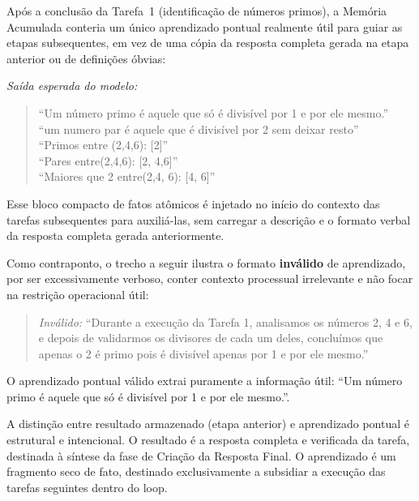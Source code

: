 \documentclass[a4paper,10pt,twocolumn]{article}
\newcommand{\saidaLLM}{%
  \smallskip\noindent\textit{Saída esperada do modelo:}\smallskip\par
}
\begin{document}
\begin{exemplo}
Após a conclusão da Tarefa~1 (identificação de números primos), a Memória Acumulada conteria um único aprendizado pontual realmente útil para guiar as etapas subsequentes, em vez de uma cópia da resposta completa gerada na etapa anterior ou de definições óbvias:

\saidaLLM

\begin{quote}
``Um número primo é aquele que só é divisível por 1 e por ele mesmo.''
\\
``um numero par é aquele que é divisível por 2 sem deixar resto''
\\
``Primos entre (2,4,6): [2]''
\\
``Pares entre(2,4,6): [2, 4,6]''
\\
``Maiores que 2 entre(2,4, 6): [4, 6]''
\end{quote}

Esse bloco compacto de fatos atômicos é injetado no início do contexto das tarefas subsequentes para auxiliá-las, sem carregar a descrição e o formato verbal da resposta completa gerada anteriormente.

\bigskip
Como contraponto, o trecho a seguir ilustra o formato \textbf{inválido} de aprendizado, por ser excessivamente verboso, conter contexto processual irrelevante e não focar na restrição operacional útil:

\begin{quote}
\textit{Inválido:} ``Durante a execução da Tarefa 1, analisamos os números 2, 4 e 6, e depois de validarmos os divisores de cada um deles, concluímos que apenas o 2 é primo pois é divisível apenas por 1 e por ele mesmo.''
\end{quote}

O aprendizado pontual válido extrai puramente a informação útil: ``Um número primo é aquele que só é divisível por 1 e por ele mesmo.''.
\end{exemplo}

A distinção entre resultado armazenado (etapa anterior) e aprendizado pontual é estrutural e intencional. O resultado é a resposta completa e verificada da tarefa, destinada à síntese da fase de Criação da Resposta Final. O aprendizado é um fragmento seco de fato, destinado exclusivamente a subsidiar a execução das tarefas seguintes dentro do loop.


\end{document}
